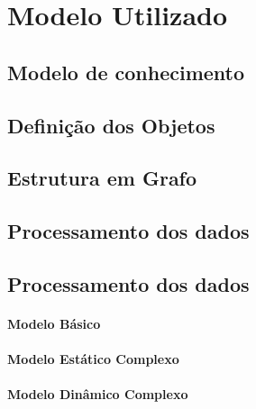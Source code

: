 \section{Modelo Utilizado}
\subsection{Modelo de conhecimento}
\subsection{Defini\c{c}\~{a}o dos Objetos}
\subsection{Estrutura em Grafo}
\subsection{Processamento dos dados}
\subsection{Processamento dos dados}
\paragraph{Modelo B\'{a}sico}
\paragraph{Modelo Est\'{a}tico Complexo}
\paragraph{Modelo Din\^{a}mico Complexo}